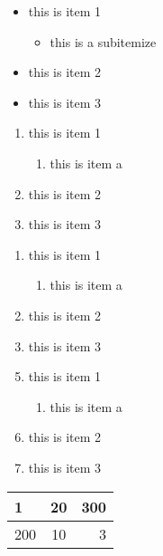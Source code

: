 \documentclass{article}
\begin{document}
\begin{itemize}
	\item this is item 1
	\begin{itemize}
	\item this is a subitemize
	\end{itemize}
	\item this is item 2
	\item this is item 3
\end{itemize}

\begin{enumerate}
	\item this is item 1
	\begin{enumerate}
	\item this is item a
	\end{enumerate}
	\item this is item 2
	\item this is item 3
\end{enumerate}
	
\begin{enumerate}[\bfseries A.]
	\item this is item 1
	\begin{enumerate}[\bfseries a.]
	\item this is item a
	\end{enumerate}
	\item this is item 2
	\item this is item 3
\end{enumerate}

\begin{enumerate}[\bfseries A.]
\setcounter{enumi} {4}
	\item this is item 1
	\begin{enumerate}[\bfseries a.]
	\item this is item a
	\end{enumerate}
	\item this is item 2
	\item this is item 3
\end{enumerate}

\eject

\begin{tabular}{|l|c|r|}
	\hline
	1&20&300\\
	\hline
	200&10&3\\
	\hline
\end{tabular}

\end{document}
